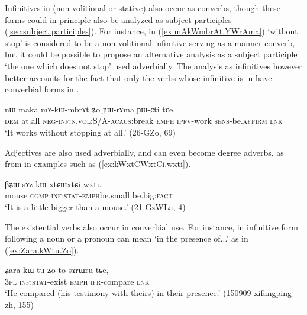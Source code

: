 Infinitives in  (non-volitional or stative) also occur as converbs, though these forms could in principle also be analyzed as subject participles (\ref{sec:subject.participles}). For instance, in (\ref{ex:mAkWmbrAt.YWrAma})  `without stop' is considered to be a non-volitional infinitive serving as a manner converb, but it could be possible to propose an alternative analysis as a  subject participle `the one which does not stop' used adverbially.  The analysis as infinitives however better accounts for the fact that only the verbs whose infinitive is in  have converbial forms in .

\begin{exe}
\ex \label{ex:mAkWmbrAt.YWrAma}
 \gll nɯ maka mɤ-kɯ-mbrɤt ʑo ɲɯ-rɤma ɲɯ-ɕti tɕe,  \\
 \textsc{dem} at.all  \textsc{neg}-\textsc{inf:n.vol}:S/A-\textsc{acaus}:break \textsc{emph} \textsc{ipfv}-work \textsc{sens}-be.\textsc{affirm} \textsc{lnk} \\
 \glt `It works without stopping at all.' (26-GZo, 69)
\end{exe}

Adjectives are also used adverbially, and can even become degree adverbs, as  from  in examples such as (\ref{ex:kWxtCWxtCi.wxti}).

\begin{exe}
\ex \label{ex:kWxtCWxtCi.wxti}
 \gll βʑɯ sɤz kɯ-xtɕɯ\redp{}xtɕi wxti. \\
 mouse \textsc{comp} \textsc{inf:stat}-\textsc{emph}\redp{}be.small be.big:\textsc{fact} \\
 \glt `It is a little bigger than a mouse.' (21-GzWLa, 4)
\end{exe}

The existential verbs also occur in converbial use. For instance,  in infinitive form  following a noun or a pronoun can mean `in the presence of...' as in (\ref{ex:Zara.kWtu.Zo}).

\begin{exe}
\ex \label{ex:Zara.kWtu.Zo}
\gll ʑara kɯ-tu ʑo to-sɤrɯru tɕe, \\
\textsc{3pl} \textsc{inf:stat}-exist \textsc{emph} \textsc{ifr}-compare \textsc{lnk} \\
\glt `He compared (his testimony with theirs) in their presence.' (150909 xifangping-zh, 155)
\end{exe}
 
